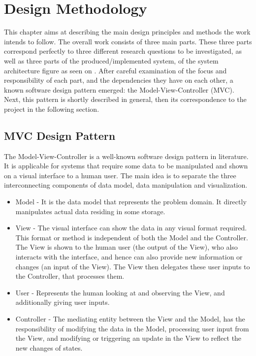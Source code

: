 \chapter{Design Methodology}

This chapter aims at describing the main design principles and methods the work intends to follow. The overall work consists of three main parts. These three parts correspond perfectly to three different research questions to be investigated, as well as three parts of the produced/implemented system, of the system architecture figure as seen on . After careful examination of the focus and responsibility of each part, and the dependencies they have on each other, a known software design pattern emerged: the Model-View-Controller (MVC). Next, this pattern is shortly described in general, then its correspondence to the project in the following section. 

\section{MVC Design Pattern}
The Model-View-Controller is a well-known software design pattern in literature. It is applicable for systems that require some data to be manipulated and shown on a visual interface to a human user. The main idea is to separate the three interconnecting components of data model, data manipulation and visualization.
\begin{itemize}
\item Model - It is the data model that represents the problem domain. It directly manipulates actual data residing in some storage. 
\item View - The visual interface can show the data in any visual format required. This format or method is independent of both the Model and the Controller. The View is shown to the human user (the output of the View), who also interacts with the interface, and hence can also provide new information or changes (an input of the View). The View then delegates these user inputs to the Controller, that processes them. 
\item User - Represents the human looking at and observing the View, and additionally giving user inputs.
\item Controller - The mediating entity between the View and the Model, has the responsibility of modifying the data in the Model, processing user input from the View, and modifying or triggering an update in the View to reflect the new changes of states.

\end{itemize}

